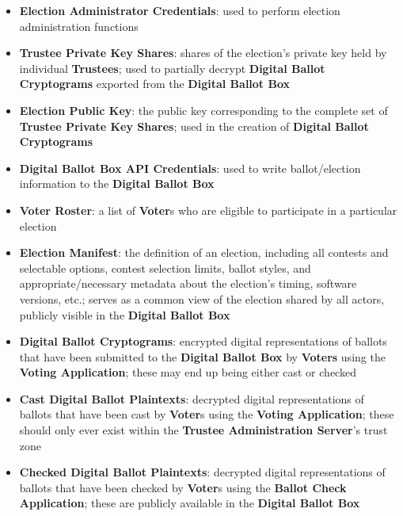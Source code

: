 \documentclass[10pt,letterpaper]{article}
\begin{document}
\begin{itemize}

    \item \textbf{Election Administrator Credentials}: used to perform election administration functions

    \item \textbf{Trustee Private Key Shares}: shares of the election's private key held by individual \textbf{Trustees}; used to partially decrypt \textbf{Digital Ballot Cryptograms} exported from the \textbf{Digital Ballot Box}

    \item \textbf{Election Public Key}: the public key corresponding to the complete set of \textbf{Trustee Private Key Shares}; used in the creation of \textbf{Digital Ballot Cryptograms}

    \item \textbf{Digital Ballot Box API Credentials}: used to write ballot/election information to the \textbf{Digital Ballot Box}

    \item \textbf{Voter Roster}: a list of \textbf{Voter}s who are eligible to participate in a particular election

    \item \textbf{Election Manifest}: the definition of an election, including all contests and selectable options, contest selection limits, ballot styles, and appropriate/necessary metadata about the election's timing, software versions, etc.; serves as a common view of the election shared by all actors, publicly visible in the \textbf{Digital Ballot Box}

    \item \textbf{Digital Ballot Cryptograms}: encrypted digital representations of ballots that have been submitted to the \textbf{Digital Ballot Box} by \textbf{Voters} using the \textbf{Voting Application}; these may end up being either cast or checked

    \item \textbf{Cast Digital Ballot Plaintexts}: decrypted digital representations of ballots that have been cast by \textbf{Voter}s using the \textbf{Voting Application}; these should only ever exist within the \textbf{Trustee Administration Server}'s trust zone

    \item \textbf{Checked Digital Ballot Plaintexts}: decrypted digital representations of ballots that have been checked by \textbf{Voter}s using the \textbf{Ballot Check Application}; these are publicly available in the \textbf{Digital Ballot Box}


\end{itemize}
\end{document}
